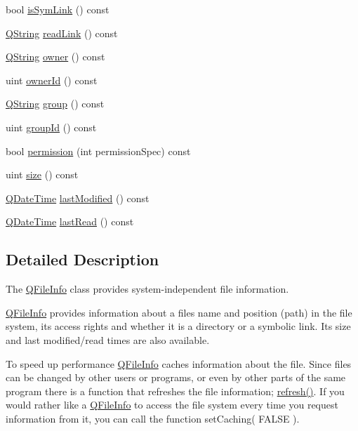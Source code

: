 \begin{DoxyCompactItemize}
\item 
bool \mbox{\hyperlink{class_q_file_info_a0e8114893edbe9d471b6f1389add29fd}{is\+Sym\+Link}} () const
\item 
\mbox{\hyperlink{class_q_string}{Q\+String}} \mbox{\hyperlink{class_q_file_info_ad6d74b51c535f45dda430ac0d755f569}{read\+Link}} () const
\item 
\mbox{\hyperlink{class_q_string}{Q\+String}} \mbox{\hyperlink{class_q_file_info_a96831b45809e905dc14e5c065bfa8421}{owner}} () const
\item 
uint \mbox{\hyperlink{class_q_file_info_ab963b7409fa73f7cc31aaff794015c4f}{owner\+Id}} () const
\item 
\mbox{\hyperlink{class_q_string}{Q\+String}} \mbox{\hyperlink{class_q_file_info_afb46f8fb3080ab0b32b4236436624ea3}{group}} () const
\item 
uint \mbox{\hyperlink{class_q_file_info_a40e9808fbf54b07717d2f3a4307da74f}{group\+Id}} () const
\item 
bool \mbox{\hyperlink{class_q_file_info_a51ec346b961f115fd7e45664d27862db}{permission}} (int permission\+Spec) const
\item 
uint \mbox{\hyperlink{class_q_file_info_a5effd75eb8571416146ac546e70cb2d7}{size}} () const
\item 
\mbox{\hyperlink{class_q_date_time}{Q\+Date\+Time}} \mbox{\hyperlink{class_q_file_info_a0dd39dbfc2db6a5af5222db19804e45a}{last\+Modified}} () const
\item 
\mbox{\hyperlink{class_q_date_time}{Q\+Date\+Time}} \mbox{\hyperlink{class_q_file_info_a0d47b9b2eb739466feb670a4102498aa}{last\+Read}} () const
\end{DoxyCompactItemize}


\subsection{Detailed Description}
The \mbox{\hyperlink{class_q_file_info}{Q\+File\+Info}} class provides system-\/independent file information. 

\mbox{\hyperlink{class_q_file_info}{Q\+File\+Info}} provides information about a file\textquotesingle{}s name and position (path) in the file system, its access rights and whether it is a directory or a symbolic link. Its size and last modified/read times are also available.

To speed up performance \mbox{\hyperlink{class_q_file_info}{Q\+File\+Info}} caches information about the file. Since files can be changed by other users or programs, or even by other parts of the same program there is a function that refreshes the file information; \mbox{\hyperlink{class_q_file_info_a2e046cd4da1f8804c9f39e05921232c5}{refresh()}}. If you would rather like a \mbox{\hyperlink{class_q_file_info}{Q\+File\+Info}} to access the file system every time you request information from it, you can call the function set\+Caching( F\+A\+L\+S\+E ).

